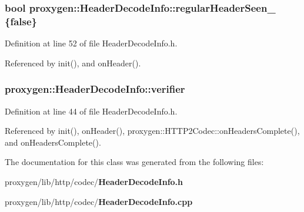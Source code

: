 \subsubsection[{regular\+Header\+Seen\+\_\+}]{\setlength{\rightskip}{0pt plus 5cm}bool proxygen\+::\+Header\+Decode\+Info\+::regular\+Header\+Seen\+\_\+ \{false\}\hspace{0.3cm}{\ttfamily [private]}}\label{classproxygen_1_1HeaderDecodeInfo_ac280b3fffa362ea88f4522806968ee27}


Definition at line 52 of file Header\+Decode\+Info.\+h.



Referenced by init(), and on\+Header().

\subsubsection[{verifier}]{ proxygen\+::\+Header\+Decode\+Info\+::verifier}\label{classproxygen_1_1HeaderDecodeInfo_a29f39dc842c38cd602a798990182fddf}


Definition at line 44 of file Header\+Decode\+Info.\+h.



Referenced by init(), on\+Header(), proxygen\+::\+H\+T\+T\+P2\+Codec\+::on\+Headers\+Complete(), and on\+Headers\+Complete().



The documentation for this class was generated from the following files\+:\begin{DoxyCompactItemize}
\item 
proxygen/lib/http/codec/{\bf Header\+Decode\+Info.\+h}\item 
proxygen/lib/http/codec/{\bf Header\+Decode\+Info.\+cpp}\end{DoxyCompactItemize}
